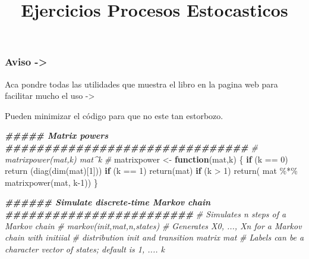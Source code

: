 \documentclass[
]{article}
\title{Ejercicios Procesos Estocasticos}
\author{}
\date{\vspace{-2.5em}}
\newenvironment{Shaded}{\begin{snugshade}}{\end{snugshade}}
\newcommand{\CommentTok}[1]{\textcolor[rgb]{0.56,0.35,0.01}{\textit{#1}}}
\newcommand{\ControlFlowTok}[1]{\textcolor[rgb]{0.13,0.29,0.53}{\textbf{#1}}}
\newcommand{\DecValTok}[1]{\textcolor[rgb]{0.00,0.00,0.81}{#1}}
\newcommand{\DocumentationTok}[1]{\textcolor[rgb]{0.56,0.35,0.01}{\textbf{\textit{#1}}}}
\newcommand{\FunctionTok}[1]{\textcolor[rgb]{0.00,0.00,0.00}{#1}}
\newcommand{\NormalTok}[1]{#1}
\newcommand{\OtherTok}[1]{\textcolor[rgb]{0.56,0.35,0.01}{#1}}
\newcommand{\SpecialCharTok}[1]{\textcolor[rgb]{0.00,0.00,0.00}{#1}}
\begin{document}
\maketitle

\hypertarget{aviso--}{%
\subsubsection{Aviso -\textgreater{}}\label{aviso--}}

Aca pondre todas las utilidades que muestra el libro en la pagina web
para facilitar mucho el uso -\textgreater{}

Pueden minimizar el código para que no este tan estorbozo.

\begin{Shaded}
\begin{Highlighting}[]
\DocumentationTok{\#\#\#\#\# Matrix powers \#\#\#\#\#\#\#\#\#\#\#\#\#\#\#\#\#\#\#\#\#\#\#\#\#\#\#\#\#\#\#}
\CommentTok{\# matrixpower(mat,k) mat\^{}k}
\CommentTok{\#}
\NormalTok{matrixpower }\OtherTok{\textless{}{-}} \ControlFlowTok{function}\NormalTok{(mat,k) \{}
    \ControlFlowTok{if}\NormalTok{ (k }\SpecialCharTok{==} \DecValTok{0}\NormalTok{) }\FunctionTok{return}\NormalTok{ (}\FunctionTok{diag}\NormalTok{(}\FunctionTok{dim}\NormalTok{(mat)[}\DecValTok{1}\NormalTok{])) }
    \ControlFlowTok{if}\NormalTok{ (k }\SpecialCharTok{==} \DecValTok{1}\NormalTok{) }\FunctionTok{return}\NormalTok{(mat)}
    \ControlFlowTok{if}\NormalTok{ (k }\SpecialCharTok{\textgreater{}} \DecValTok{1}\NormalTok{) }\FunctionTok{return}\NormalTok{( mat }\SpecialCharTok{\%*\%} \FunctionTok{matrixpower}\NormalTok{(mat, k}\DecValTok{{-}1}\NormalTok{))}
\NormalTok{ \}}

\DocumentationTok{\#\#\#\#\#\# Simulate discrete{-}time Markov chain \#\#\#\#\#\#\#\#\#\#\#\#\#\#\#\#\#\#\#\#\#\#\#\#}
\CommentTok{\# Simulates n steps of a Markov chain }
\CommentTok{\# markov(init,mat,n,states)}
\CommentTok{\# Generates X0, ..., Xn for a Markov chain with initiial}
\CommentTok{\#  distribution init and transition matrix mat}
\CommentTok{\# Labels can be a character vector of states; default is 1, .... k}


\end{Highlighting}
\end{Shaded}
\end{document}
